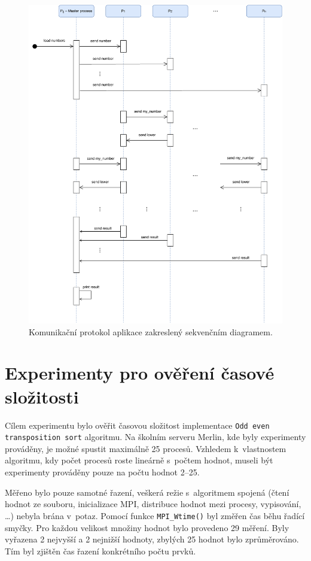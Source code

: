 \documentclass[11pt, a4paper, titlepage]{article}
\begin{document}
\begin{figure}[H]
    \centering
    \includegraphics[width=.95\textwidth]{diagram.pdf}
    \caption{Komunikační protokol aplikace zakreslený sekvenčním diagramem.}
\end{figure}


\section{Experimenty pro ověření časové složitosti}\label{sec:experimenty}

Cílem experimentu bylo ověřit časovou složitost implementace \texttt{Odd even transposition sort} algoritmu.
Na školním serveru Merlin, kde byly experimenty prováděny, je možné spustit maximálně 25 procesů.
Vzhledem k~vlastnostem algoritmu, kdy počet procesů roste lineárně s~počtem hodnot, museli být experimenty prováděny pouze na počtu hodnot 2--25.

Měřeno bylo pouze samotné řazení, veškerá režie s~algoritmem spojená (čtení hodnot ze souboru, inicializace MPI, distribuce hodnot mezi procesy, vypisování, \ldots) nebyla brána v~potaz.
Pomocí funkce \texttt{MPI\_Wtime()} byl změřen čas běhu řadící smyčky.
Pro každou velikost množiny hodnot bylo provedeno 29 měření.
Byly vyřazena 2 nejvyšší a 2 nejnižší hodnoty, zbylých 25 hodnot bylo zprůměrováno.
Tím byl zjištěn čas řazení konkrétního počtu prvků.
\medskip
\end{document}

